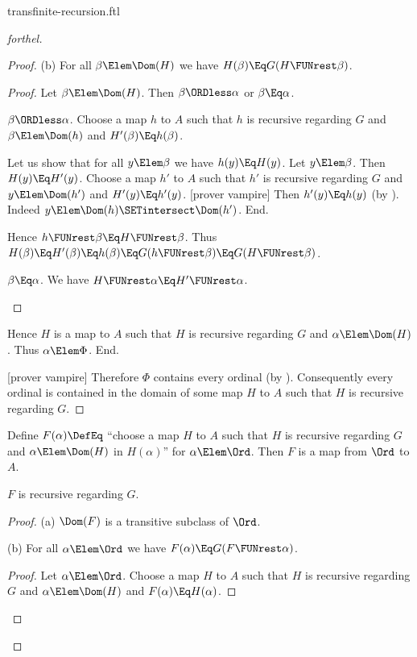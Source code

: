\documentclass{stex}
\begin{document}
\begin{smodule}{transfinite-recursion.ftl}
\begin{proof}[forthel]
\begin{proof}
      (b) For all $\beta \Elem \Dom(H)$ we have $H(\beta) \Eq G(H \FUNrest \beta)$.
      \begin{proof}
        Let $\beta \Elem \Dom(H)$.
        Then $\beta \ORDless \alpha$ or $\beta \Eq \alpha$.

        \begin{case}{$\beta \ORDless \alpha$.}
          Choose a map $h$ to $A$ such that $h$ is recursive regarding $G$ and $\beta \Elem \Dom(h)$ and $H'(\beta) \Eq h(\beta)$.

          Let us show that for all $y \Elem \beta$ we have $h(y) \Eq H(y)$.
            Let $y \Elem \beta$.
            Then $H(y) \Eq H'(y)$.
            Choose a map $h'$ to $A$ such that $h'$ is recursive regarding $G$ and $y \Elem \Dom(h')$ and $H'(y) \Eq h'(y)$.
            [prover vampire]
            Then $h'(y) \Eq h(y)$ (by ).
            Indeed $y \Elem \Dom(h) \SETintersect \Dom(h')$.
          End.

          Hence $h \FUNrest \beta \Eq H \FUNrest \beta$.
          Thus $H(\beta)
            \Eq H'(\beta)
            \Eq h(\beta)
            \Eq G(h \FUNrest \beta)
            \Eq G(H \FUNrest \beta)$.
        \end{case}

        \begin{case}{$\beta \Eq \alpha$.}
          We have $H \FUNrest \alpha \Eq H' \FUNrest \alpha$.
        \end{case}
      \end{proof}

      Hence $H$ is a map to $A$ such that $H$ is recursive regarding $G$ and $\alpha \Elem \Dom(H)$.
      Thus $\alpha \Elem \Phi$.
    End.

    [prover vampire]
    Therefore $\Phi$ contains every ordinal (by ).
    Consequently every ordinal is contained in the domain of some map $H$ to $A$ such that $H$ is recursive regarding $G$.
  \end{proof}

  Define $F(\alpha) \DefEq$ ``choose a map $H$ to $A$ such that $H$ is recursive regarding $G$ and $\alpha \Elem \Dom(H)$ in $H(\alpha)$'' for $\alpha \Elem \Ord$.
  Then $F$ is a map from $\Ord$ to $A$.

  $F$ is recursive regarding $G$.
  \begin{proof}
    (a) $\Dom(F)$ is a transitive subclass of $\Ord$.

    (b) For all $\alpha \Elem \Ord$ we have $F(\alpha) \Eq G(F \FUNrest \alpha)$.
    \begin{proof}
      Let $\alpha \Elem \Ord$.
      Choose a map $H$ to $A$ such that $H$ is recursive regarding $G$ and $\alpha \Elem \Dom(H)$ and $F(\alpha) \Eq H(\alpha)$.


\end{proof}
\end{proof}
\end{proof}
\end{smodule}
\end{document}
